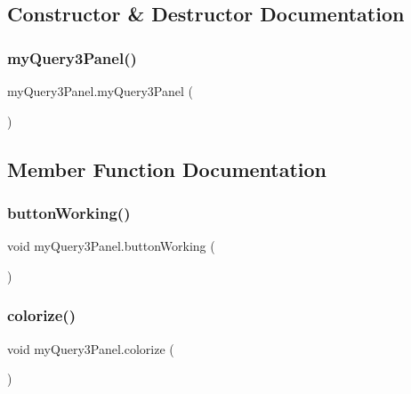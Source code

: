 \subsection{Constructor \& Destructor Documentation}
\hypertarget{classmy_query3_panel_a41792f89e40b96e00d365f08c64ede34}{}\label{classmy_query3_panel_a41792f89e40b96e00d365f08c64ede34} 
\subsubsection{\texorpdfstring{my\+Query3\+Panel()}{myQuery3Panel()}}
{\footnotesize\ttfamily my\+Query3\+Panel.\+my\+Query3\+Panel (\begin{DoxyParamCaption}{ }\end{DoxyParamCaption})}



\subsection{Member Function Documentation}
\hypertarget{classmy_query3_panel_a733fe7c07a4083484bde4cf976ef62dc}{}\label{classmy_query3_panel_a733fe7c07a4083484bde4cf976ef62dc} 
\subsubsection{\texorpdfstring{button\+Working()}{buttonWorking()}}
{\footnotesize\ttfamily void my\+Query3\+Panel.\+button\+Working (\begin{DoxyParamCaption}{ }\end{DoxyParamCaption})}

\hypertarget{classmy_query3_panel_a81388a516e95727e7d69abd71cae43fa}{}\label{classmy_query3_panel_a81388a516e95727e7d69abd71cae43fa} 
\subsubsection{\texorpdfstring{colorize()}{colorize()}}
{\footnotesize\ttfamily void my\+Query3\+Panel.\+colorize (\begin{DoxyParamCaption}{ }\end{DoxyParamCaption})\hspace{0.3cm}{\ttfamily [private]}}

